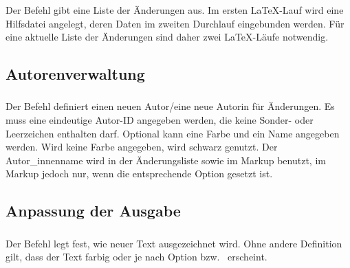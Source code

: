 \subsubsection{}
\DescribeMacro{\listofchanges}

Der Befehl  gibt eine Liste der Änderungen aus.
Im ersten \LaTeX-Lauf wird eine Hilfsdatei angelegt, deren Daten im zweiten Durchlauf eingebunden werden.
Für eine aktuelle Liste der Änderungen sind daher zwei \LaTeX-Läufe notwendig.





\subsection{Autorenverwaltung}
\label{sec:user:authormanagement}

\subsubsection{}

Der Befehl  definiert einen neuen Autor/eine neue Autorin für Änderungen.
Es muss eine eindeutige Autor-ID angegeben werden, die keine Sonder- oder Leerzeichen enthalten darf.
Optional kann eine Farbe und ein Name angegeben werden.
Wird keine Farbe angegeben, wird schwarz genutzt.
Der Autor\_innenname wird in der Änderungsliste sowie im Markup benutzt, im Markup jedoch nur, wenn die entsprechende Option gesetzt ist.




\subsection{Anpassung der Ausgabe}
\label{sec:user:customizingoutput}

\subsubsection{}
\DescribeMacro{\setaddedmarkup}

Der Befehl  legt fest, wie neuer Text ausgezeichnet wird.
Ohne andere Definition gilt, dass der Text farbig oder je nach Option  bzw.\  erscheint.

